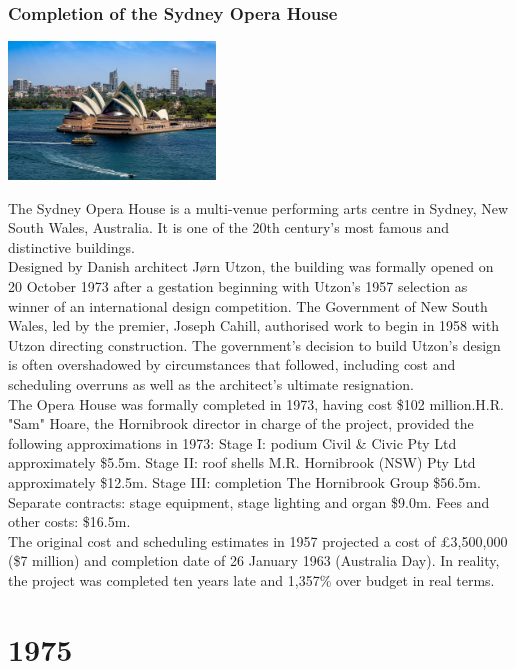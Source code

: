 \documentclass[11pt]{report}
\begin{document}
\subsection{Completion of the Sydney Opera House}
\vspace{2mm}\begin{center}\includegraphics[width=5.5cm]{./img/operaHouse.jpg}\end{center}
The Sydney Opera House is a multi-venue performing arts centre in Sydney, New South Wales, Australia. It is one of the 20th century's most famous and distinctive buildings.\\
\indent Designed by Danish architect Jørn Utzon, the building was formally opened on 20 October 1973 after a gestation beginning with Utzon's 1957 selection as winner of an international design competition. The Government of New South Wales, led by the premier, Joseph Cahill, authorised work to begin in 1958 with Utzon directing construction. The government's decision to build Utzon's design is often overshadowed by circumstances that followed, including cost and scheduling overruns as well as the architect's ultimate resignation.\\
\indent The Opera House was formally completed in 1973, having cost \$102 million.H.R. "Sam" Hoare, the Hornibrook director in charge of the project, provided the following approximations in 1973: Stage I: podium Civil \& Civic Pty Ltd approximately \$5.5m. Stage II: roof shells M.R. Hornibrook (NSW) Pty Ltd approximately \$12.5m. Stage III: completion The Hornibrook Group \$56.5m. Separate contracts: stage equipment, stage lighting and organ \$9.0m. Fees and other costs: \$16.5m.\\
\indent The original cost and scheduling estimates in 1957 projected a cost of £3,500,000 (\$7 million) and completion date of 26 January 1963 (Australia Day). In reality, the project was completed ten years late and 1,357\% over budget in real terms.

\chapter{1975}
\end{document}
